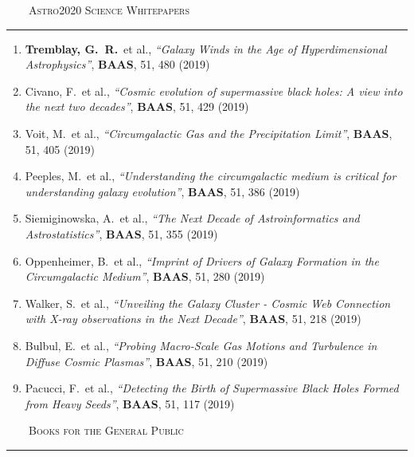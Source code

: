 \documentclass[11pt]{article}
\makeatletter
\def\vhrulefill#1{\leavevmode\leaders\hrule\@height#1\hfill \kern\z@}
\makeatother
\begin{document}
\clearpage

\noindent \textsc{ ~~~~Astro2020 Science Whitepapers} \vhrulefill{0.4pt}

\begin{enumerate}

\item \textbf{Tremblay, G.~R.}~et al., \textit{``Galaxy Winds in the Age of Hyperdimensional Astrophysics''}, \textbf{BAAS}, 51, 480 (2019)

\item Civano, F.~et al., \textit{``Cosmic evolution of supermassive black holes: A view into the next two decades''}, \textbf{BAAS}, 51, 429 (2019)

\item Voit, M.~et al., \textit{``Circumgalactic Gas and the Precipitation Limit''}, \textbf{BAAS}, 51, 405 (2019)

\item Peeples, M.~et al., \textit{``Understanding the circumgalactic medium is critical for understanding galaxy evolution''}, \textbf{BAAS}, 51, 386 (2019)

\item Siemiginowska, A.~et al., \textit{``The Next Decade of Astroinformatics and Astrostatistics''}, \textbf{BAAS}, 51, 355 (2019)


\item Oppenheimer, B.~et al., \textit{``Imprint of Drivers of Galaxy Formation in the Circumgalactic Medium''}, \textbf{BAAS}, 51, 280 (2019)


\item Walker, S.~et al., \textit{``Unveiling the Galaxy Cluster - Cosmic Web Connection with X-ray observations in the Next Decade''}, \textbf{BAAS}, 51, 218 (2019)


\item Bulbul, E.~et al., \textit{``Probing Macro-Scale Gas Motions and Turbulence in Diffuse Cosmic Plasmas''}, \textbf{BAAS}, 51, 210 (2019)


\item Pacucci, F.~et al., \textit{``Detecting the Birth of Supermassive Black Holes Formed from Heavy Seeds''}, \textbf{BAAS}, 51, 117 (2019)


\end{enumerate}

\hspace*{3mm}

\noindent \textsc{ ~~~~Books for the General Public} \vhrulefill{0.4pt}
\end{document}
